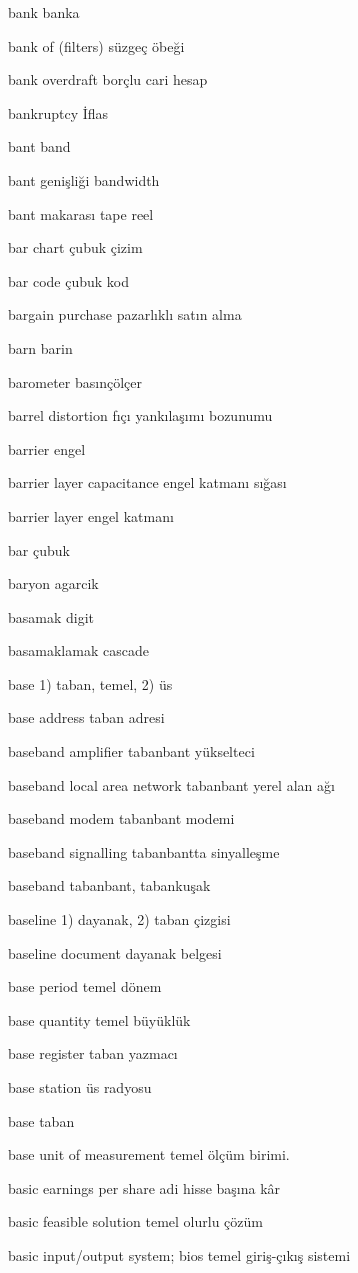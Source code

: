 \documentclass[12pt,fleqn]{article}\usepackage{../../common}
\begin{document}
bank banka

bank of (filters) süzgeç öbeği

bank overdraft borçlu cari hesap

bankruptcy İflas

bant band

bant genişliği bandwidth

bant makarası tape reel

bar chart çubuk çizim

bar code çubuk kod

bargain purchase pazarlıklı satın alma

barn barin

barometer basınçölçer

barrel distortion fıçı yankılaşımı bozunumu

barrier engel

barrier layer capacitance engel katmanı sığası

barrier layer engel katmanı

bar çubuk

baryon agarcik

basamak digit

basamaklamak cascade

base 1) taban, temel, 2) üs

base address taban adresi

baseband amplifier tabanbant yükselteci

baseband local area network tabanbant yerel alan ağı

baseband modem tabanbant modemi

baseband signalling tabanbantta sinyalleşme

baseband tabanbant, tabankuşak

baseline 1) dayanak, 2) taban çizgisi

baseline document dayanak belgesi

base period temel dönem

base quantity temel büyüklük

base register taban yazmacı

base station üs radyosu

base taban

base unit of measurement temel ölçüm birimi.

basic earnings per share adi hisse başına kâr

basic feasible solution temel olurlu çözüm

basic input/output system; bios temel giriş-çıkış sistemi
\end{document}
